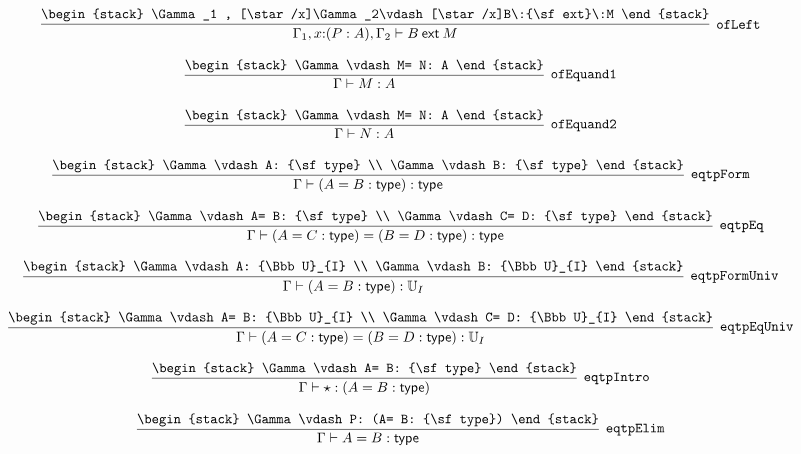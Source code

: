 \[
\infer[{\tt ofLeft}]{\Gamma_1 ,x\mathord{:}(P: A), \Gamma_2 \vdash B\:{\sf ext}\:M}{
\begin{stack}
\Gamma_1 , [\star /x]\Gamma_2\vdash [\star /x]B\:{\sf ext}\:M
\end{stack}}
\]

\[
\infer[{\tt ofEquand1}]{\Gamma \vdash M: A}{
\begin{stack}
\Gamma \vdash M= N: A
\end{stack}}
\]

\[
\infer[{\tt ofEquand2}]{\Gamma \vdash N: A}{
\begin{stack}
\Gamma \vdash M= N: A
\end{stack}}
\]

\[
\infer[{\tt eqtpForm}]{\Gamma \vdash (A= B: {\sf type}): {\sf type}}{
\begin{stack}
\Gamma \vdash A: {\sf type}
\\
\Gamma \vdash B: {\sf type}
\end{stack}}
\]

\[
\infer[{\tt eqtpEq}]{\Gamma \vdash (A= C: {\sf type})= (B= D: {\sf type}): {\sf type}}{
\begin{stack}
\Gamma \vdash A= B: {\sf type}
\\
\Gamma \vdash C= D: {\sf type}
\end{stack}}
\]

\[
\infer[{\tt eqtpFormUniv}]{\Gamma \vdash (A= B: {\sf type}): {\Bbb U}_{I}}{
\begin{stack}
\Gamma \vdash A: {\Bbb U}_{I}
\\
\Gamma \vdash B: {\Bbb U}_{I}
\end{stack}}
\]

\[
\infer[{\tt eqtpEqUniv}]{\Gamma \vdash (A= C: {\sf type})= (B= D: {\sf type}): {\Bbb U}_{I}}{
\begin{stack}
\Gamma \vdash A= B: {\Bbb U}_{I}
\\
\Gamma \vdash C= D: {\Bbb U}_{I}
\end{stack}}
\]

\[
\infer[{\tt eqtpIntro}]{\Gamma \vdash \star : (A= B: {\sf type})}{
\begin{stack}
\Gamma \vdash A= B: {\sf type}
\end{stack}}
\]

\[
\infer[{\tt eqtpElim}]{\Gamma \vdash A= B: {\sf type}}{
\begin{stack}
\Gamma \vdash P: (A= B: {\sf type})
\end{stack}}
\]

